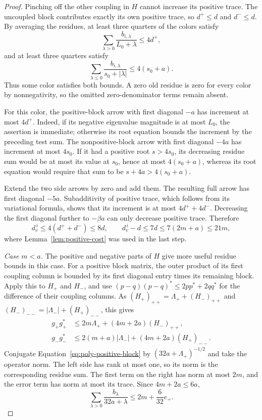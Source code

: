 \begin{proof}
Pinching off the other coupling in \(H\) cannot increase its positive
trace.  The uncoupled block contributes exactly its own positive trace,
so \(d^+\leq d\) and \(d^-\leq d\).
By averaging the residues, at least three quarters of the colors satisfy
\[
          \sum_{\lambda>0}\frac{b_{i,\lambda}}{L_0+\lambda}
                                   \leq4d^+,
\]
and at least three quarters satisfy
\[
          \sum_{\lambda\leq0}\frac{b_{i,\lambda}}{s_0+|\lambda|}
                                   \leq4(s_0+a).
\]
Thus some color satisfies both bounds.  A zero old residue is zero for
every color by nonnegativity, so the omitted zero-denominator terms
remain absent.

For this color, the positive-block arrow with first diagonal \(-a\)
has increment at most \(4d^+\).  Indeed, if its negative eigenvalue
magnitude is at most \(L_0\), the assertion is immediate; otherwise
its root equation bounds the increment by the preceding test sum.
The nonpositive-block arrow with first diagonal \(-4a\) has increment
at most \(4s_0\).  If it had a positive root \(s>4s_0\), its decreasing
residue sum would be at most its value at \(s_0\), hence at most
\(4(s_0+a)\), whereas its root equation would require that sum to be
\(s+4a>4(s_0+a)\).

Extend the two side arrows by zero and add them.  The resulting full
arrow has first diagonal \(-5a\).  Subadditivity of positive trace,
which follows from its variational formula, shows that its increment
is at most \(4d^++4d^-\).  Decreasing the first diagonal further to
\(-\beta a\) can only decrease positive trace.  Therefore
\[
       d_v^{\,i}\leq4(d^++d^-)\leq8d,\qquad
       d_v^{\,i}-d\leq7d\leq7(2m+a)\leq21m,
\]
where Lemma~\ref{lem:positive-cost} was used in the last step.

\smallskip\noindent
\emph{Case \(m<a\).}
The positive and negative parts of \(H\) give more useful residue
bounds in this case.  For a positive block matrix, the outer product
of its first coupling column is bounded by its first diagonal entry
times its remaining block.  Apply this to \(H_+\) and \(H_-\), and use
\((p-q)(p-q)^*\leq2pp^*+2qq^*\) for the difference of their coupling
columns.  As
\((H_+)_{++}=\Lambda_++(H_-)_{++}\) and
\((H_-)_{--}=|\Lambda_-|+(H_+)_{--}\), this gives
\begin{align}
 g_+g_+^*&\leq
       2m\Lambda_++(4m+2a)(H_-)_{++},
 \label{eq:poly-positive-block}\\
 g_-g_-^*&\leq
       2(m+a)|\Lambda_-|+(4m+2a)(H_+)_{--}.
 \label{eq:poly-negative-block}
\end{align}
Conjugate Equation~\eqref{eq:poly-positive-block} by
\((32a+\Lambda_+)^{-1/2}\) and take the operator norm.
The left side has rank at most one, so its norm is the corresponding
residue sum.  The first term on the right has norm at most \(2m\),
and the error term has norm at most its trace.  Since \(4m+2a\leq6a\),
\begin{equation}
                 \sum_{\lambda>0}\frac{b_\lambda}{32a+\lambda}
                              \leq2m+\frac6{32}e_+.
 \label{eq:poly-positive-test}
\end{equation}


\end{proof}
